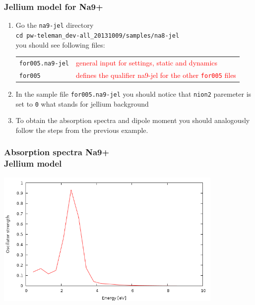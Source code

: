 \documentclass[10pt]{beamer}
\begin{document}
\begin{frame}
\frametitle{Jellium model for Na9+}
\begin{enumerate}
\item Go the {\tt na9-jel} directory\\
\vspace*{0.2cm}
{\tt cd pw-teleman\_dev-all\_20131009/samples/na8-jel}\\
\vspace*{0.2cm}
you should see following files:\\
\vspace*{0.2cm}
\begin{tabular}{ll}
{\tt for005.na9-jel} &{\scriptsize{\textcolor{red}{general input for settings, static and dynamics}}}\\
{\tt for005}  &{\scriptsize{\textcolor{red}{defines the qualifier na9-jel for the other {\tt for005} files}}}\\
\end{tabular}
\vspace*{0.4cm}


\item In the sample file {\tt for005.na9-jel} you should notice that {\tt nion2} paremeter is set to {\tt 0} what stands for jellium background

\item To obtain the absorption spectra and dipole moment you should analogously follow the steps from the previous example. 
\end{enumerate}
\end{frame}
\begin{frame}
\frametitle{Absorption spectra Na9+\\
Jellium model}

\centering
\includegraphics[width=11cm]{fig/spectrana9j} 

\end{frame}
\end{document}
